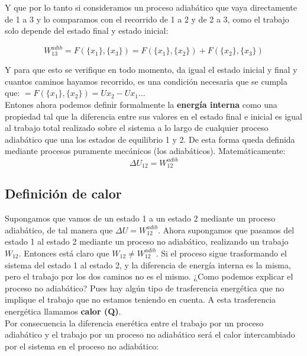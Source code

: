 \documentclass[12pt,a4paper]{article}
\begin{document}
Y que por lo tanto si consideramos un proceso adiabático que vaya directamente de 1 a 3 y lo comparamos con el recorrido de 1 a 2 y de 2 a 3, como el trabajo solo depende del estado final y estado inicial:

$$  W_{13}^{adib} = F(\lbrace x_1 \rbrace , \lbrace x_3 \rbrace) = F(\lbrace x_1 \rbrace , \lbrace x_2 \rbrace) + F(\lbrace x_2 \rbrace , \lbrace x_3 \rbrace)$$

Y para que esto se verifique en todo momento, da igual el estado inicial y final y cuantos caminos hayamos recorrido, es una condición necesaria que se cumpla que:  $  = F(\lbrace x_1 \rbrace , \lbrace x_2 \rbrace) = U{x_2}-U{x_1}$... \\

Entones ahora podemos definir formalmente la \textbf{energía interna} como una propiedad tal que la diferencia entre sus valores en el estado final e inicial es igual al trabajo total realizado sobre el sistema a lo largo de cualquier proceso adiabático que una los estados de equilibrio 1 y 2. De esta forma queda definida mediante procesos puramente mecánicos (los adiabáticos). Matemáticamente: \\


\begin{equation}
\Delta U_{12} = W_{12}^{adib}
\end{equation}



\subsection{Definición de calor}

Supongamos que vamos de un estado 1 a un estado 2 mediante un proceso adiabático, de tal manera que $\Delta U = W_{12}^{adib}$. Ahora supongamos que pasamos del estado 1 al estado 2 mediante un proceso no adiabático, realizando un trabajo $W_{12}$. Entonces está claro que $W_{12} \neq W_{12}^{adib}$. Si el proceso sigue trasformando el sistema del estado 1 al estado 2, y la diferencia de energía interna es la misma, pero el trabajo por los dos caminos no es el mismo. ¿Como podemos explicar el proceso no adiabático? Pues hay algún tipo de trasferencia energética que no implique el trabajo que no estamos teniendo en cuenta. A esta trasferencia energética llamamos \textbf{calor (Q)}. \\

Por consecuencia la diferencia enerética entre el trabajo por un proceso adiabático y el trabajo por un proceso no adiabático será el calor intercambiado por el sistema en el proceso no adiabático:
\end{document}
